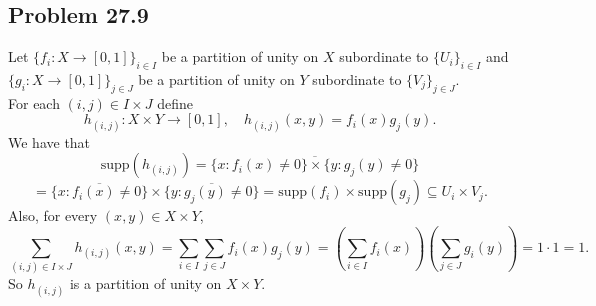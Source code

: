\documentclass{article}
\newcommand{\lb}{\left(}
\newcommand{\rb}{\right)}
\newcommand{\supp}{\text{supp}}
\begin{document}
\subsection*{Problem 27.9}
Let $\{f_i: X \to [0, 1]\}_{i \in I}$ be a partition of unity on $X$ subordinate to $\{U_i\}_{i \in I}$ and $\{g_i: X \to [0, 1]\}_{j \in J}$ be a partition of unity on $Y$ subordinate to $\{V_j\}_{j \in J}$. \\

For each $(i, j) \in I\times J$ define
$$h_{(i, j)}: X\times Y \to [0, 1], \quad h_{(i, j)}(x, y) = f_i(x)g_j(y).$$
We have that
$$\supp(h_{(i,j)}) = \overline{\{x: f_i(x) \neq 0\} \times \{y: g_j(y) \neq 0\}}$$
$$= \overline{\{x: f_i(x) \neq 0\}} \times \overline{\{y: g_j(y) \neq 0\}} = \supp (f_i) \times \supp(g_j) \subseteq U_i \times V_j.$$
Also, for every $(x, y) \in X\times Y$,
$$\sum_{(i, j) \in I\times J}h_{(i, j)}(x, y) = \sum_{i \in I}\sum_{j \in J} f_i(x)g_j(y) = \lb\sum_{i\in I}f_i(x)\rb\lb\sum_{j\in J}g_i(y)\rb = 1\cdot 1 = 1.$$
So $h_{(i, j)}$ is a partition of unity on $X\times Y$.
\end{document}
